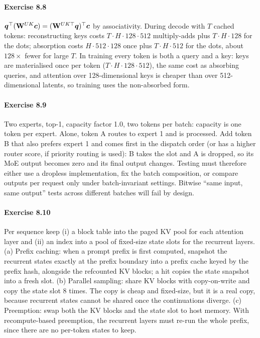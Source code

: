 \paragraph{Exercise 8.8} $\bm{q}^\top(\mathbf{W}^{UK}\bm{c})=(\mathbf{W}^{UK\top}\bm{q})^\top\bm{c}$ by
associativity. During decode with $T$ cached tokens: reconstructing keys costs $T\cdot H\cdot128\cdot512$
multiply-adds plus $T\cdot H\cdot128$ for the dots; absorption costs $H\cdot512\cdot128$ once plus $T\cdot H\cdot512$
for the dots, about $128\times$ fewer for large $T$. In training every token is both a query and a key: keys are
materialised once per token ($T\cdot H\cdot128\cdot512$), the same cost as absorbing queries, and attention over
128-dimensional keys is cheaper than over 512-dimensional latents, so training uses the non-absorbed form.

\paragraph{Exercise 8.9} Two experts, top-1, capacity factor 1.0, two tokens per batch: capacity is one token per
expert. Alone, token A routes to expert 1 and is processed. Add token B that also prefers expert 1 and comes
first in the dispatch order (or has a higher router score, if priority routing is used): B takes the slot and A
is dropped, so its MoE output becomes zero and its final output changes. Testing must therefore either use
a dropless implementation, fix the batch composition, or compare outputs per request only under
batch-invariant settings. Bitwise ``same input, same output'' tests across different batches will fail by
design.

\paragraph{Exercise 8.10} Per sequence keep (i) a block table into the paged KV pool for each attention layer and
(ii) an index into a pool of fixed-size state slots for the recurrent layers. (a) Prefix caching: when a
prompt prefix is first computed, snapshot the recurrent states exactly at the prefix boundary into a prefix
cache keyed by the prefix hash, alongside the refcounted KV blocks; a hit copies the state snapshot into a
fresh slot. (b) Parallel sampling: share KV blocks with copy-on-write and copy the state slot 8 times. The copy
is cheap and fixed-size, but it is a real copy, because recurrent states cannot be shared once the
continuations diverge. (c) Preemption: swap both the KV blocks and the state slot to host memory. With
recompute-based preemption, the recurrent layers must re-run the whole prefix, since there are no per-token
states to keep.
